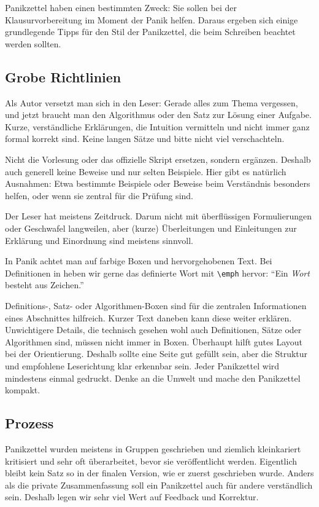 \documentclass{panikzettel}
\begin{document}
Panikzettel haben einen bestimmten Zweck: Sie sollen bei der Klausurvorbereitung im Moment der Panik helfen.
Daraus ergeben sich einige grundlegende Tipps für den Stil der Panikzettel, die beim Schreiben beachtet werden sollten.

\subsection{Grobe Richtlinien}

Als Autor versetzt man sich in den Leser: Gerade alles zum Thema vergessen, und jetzt braucht man den Algorithmus oder den Satz zur Lösung einer Aufgabe.
Kurze, verständliche Erklärungen, die Intuition vermitteln und nicht immer ganz formal korrekt sind.
Keine langen Sätze und bitte nicht viel verschachteln.

Nicht die Vorlesung oder das offizielle Skript ersetzen, sondern ergänzen.
Deshalb auch generell keine Beweise und nur selten Beispiele.
Hier gibt es natürlich Ausnahmen: Etwa bestimmte Beispiele oder Beweise beim Verständnis besonders helfen, oder wenn sie zentral für die Prüfung sind.

Der Leser hat meistens Zeitdruck.
Darum nicht mit überflüssigen Formulierungen oder Geschwafel langweilen, aber (kurze) Überleitungen und Einleitungen zur Erklärung und Einordnung sind meistens sinnvoll.

In Panik achtet man auf farbige Boxen und hervorgehobenen Text.
Bei Definitionen in heben wir gerne das definierte Wort mit \texttt{\textbackslash{}emph} hervor: ``Ein \emph{Wort} besteht aus Zeichen.''

Definitions-, Satz- oder Algorithmen-Boxen sind für die zentralen Informationen eines Abschnittes hilfreich.
Kurzer Text daneben kann diese weiter erklären.
Unwichtigere Details, die technisch gesehen wohl auch Definitionen, Sätze oder Algorithmen sind, müssen nicht immer in Boxen.
Überhaupt hilft gutes Layout bei der Orientierung.
Deshalb sollte eine Seite gut gefüllt sein, aber die Struktur und empfohlene Leserichtung klar erkennbar sein.
Jeder Panikzettel wird mindestens einmal gedruckt.
Denke an die Umwelt und mache den Panikzettel kompakt.

\subsection{Prozess}

Panikzettel wurden meistens in Gruppen geschrieben und ziemlich kleinkariert kritisiert und sehr oft überarbeitet, bevor sie veröffentlicht werden.
Eigentlich bleibt kein Satz so in der finalen Version, wie er zuerst geschrieben wurde.
Anders als die private Zusammenfassung soll ein Panikzettel auch für andere verständlich sein.
Deshalb legen wir sehr viel Wert auf Feedback und Korrektur.
\end{document}
